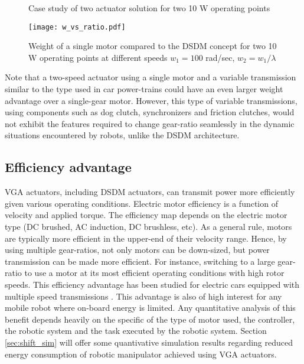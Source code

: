 \begin{figure}[H]
        \centering
        \caption{Case study of two actuator solution for two 10 W operating points }\label{fig:solutions}
\end{figure}

\begin{figure}[H]
	\centering
		\texttt{[image: w\_vs\_ratio.pdf]}
	\caption[DSDM weight analysis]{Weight of a single motor compared to the DSDM concept for two 10 W operating points at different speeds $w_1=100$ rad/sec, $w_2 = w_1 / \lambda$}
	\label{fig:1vs2}
\end{figure}

Note that a two-speed actuator using a single motor and a variable transmission similar to the type used in car power-trains could have an even larger weight advantage over a single-gear motor. However, this type of variable transmissions, using components such as dog clutch, synchronizers and friction clutches, would not exhibit the features required to change gear-ratio seamlessly in the dynamic situations encountered by robots, unlike the DSDM architecture.

\subsection{Efficiency advantage}
\label{sec:EffAdvantage}

VGA actuators, including DSDM actuators, can transmit power more efficiently given various operating conditions. Electric motor efficiency is a function of velocity and applied torque. The efficiency map depends on the electric motor type (DC brushed, AC induction, DC brushless, etc). As a general rule, motors are typically more efficient in the upper-end of their velocity range. Hence, by using multiple gear-ratios, not only motors can be down-sized, but power transmission can be made more efficient. For instance, switching to a large gear-ratio to use a motor at its most efficient operating conditions with high rotor speeds. This efficiency advantage has been studied for electric cars equipped with multiple speed transmissions \cite{ren_effect_2009} \cite{holdstock_energy_2012} \cite{zhang_three-speed_2013} \cite{mckeegan_antonovs_2011}. This advantage is also of high interest for any mobile robot where on-board energy is limited. Any quantitative analysis of this benefit depends heavily on the specific of the type of motor used, the controller, the robotic system and the task executed by the robotic system. Section \ref{sec:shift_sim} will offer some quantivative simulation results regarding reduced energy consumption of robotic manipulator achieved using VGA actuators.

